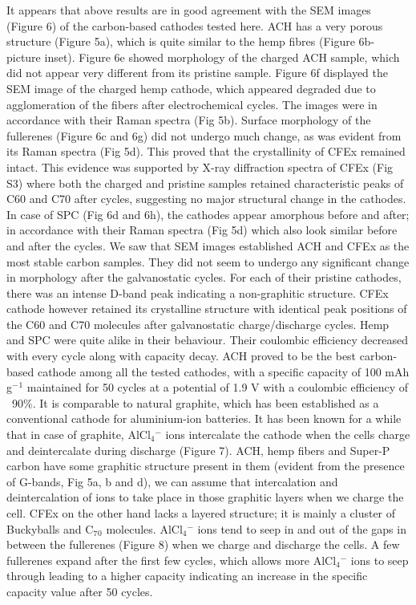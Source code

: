 \documentclass{article}
\begin{document}
It appears that above results are in good agreement with the SEM images (Figure 6) of the carbon-based cathodes tested here. ACH has a very porous structure (Figure 5a), which is quite similar to the hemp fibres (Figure 6b- picture inset). Figure 6e showed morphology of the charged ACH sample, which did not appear very different from its pristine sample. Figure 6f displayed the SEM image of the charged hemp cathode, which appeared degraded due to agglomeration of the fibers after electrochemical cycles. The images were in accordance with their Raman spectra (Fig 5b). Surface morphology of the fullerenes (Figure 6c and 6g) did not undergo much change, as was evident from its Raman spectra (Fig 5d). This proved that the crystallinity of CFEx remained intact. This evidence was supported by X-ray diffraction spectra of CFEx (Fig S3) where both the charged and pristine samples retained characteristic peaks of C60 and C70 after cycles, suggesting no major structural change in the cathodes. In case of SPC (Fig 6d and 6h), the cathodes appear amorphous before and after; in accordance with their Raman spectra (Fig 5d) which also look similar before and after the cycles. We saw that SEM images established ACH and CFEx as the most stable carbon samples. They did not seem to undergo any significant change in morphology after the galvanostatic cycles. For each of their pristine cathodes, there was an intense D-band peak indicating a non-graphitic structure. CFEx cathode however retained its crystalline structure with identical peak positions of the C60 and C70 molecules after galvanostatic charge/discharge cycles. Hemp and SPC were quite alike in their behaviour. Their coulombic efficiency decreased with every cycle along with capacity decay. ACH proved to be the best carbon-based cathode among all the tested cathodes, with a specific capacity of 100 mAh g$^-{^1}$ maintained for 50 cycles at a potential of 1.9 V with a coulombic efficiency of ~90\%. It is comparable to natural graphite, which has been established as a conventional cathode for aluminium-ion batteries. It has been known for a while that in case of graphite, AlCl$_4{^-}$ ions intercalate the cathode when the cells charge and deintercalate during discharge (Figure 7). ACH, hemp fibers and Super-P carbon have some graphitic structure present in them (evident from the presence of G-bands, Fig 5a, b and d), we can assume that intercalation and deintercalation of ions to take place in those graphitic layers when we charge the cell. CFEx on the other hand lacks a layered structure; it is mainly a cluster of Buckyballs and C$_7{_0}$ molecules. AlCl$_4{^-}$ ions tend to seep in and out of the gaps in between the fullerenes (Figure 8) when we charge and discharge the cells. A few fullerenes expand after the first few cycles, which allows more AlCl$_4{^-}$ ions to seep through leading to a higher capacity indicating an increase in the specific capacity value after 50 cycles. 
\end{document}
